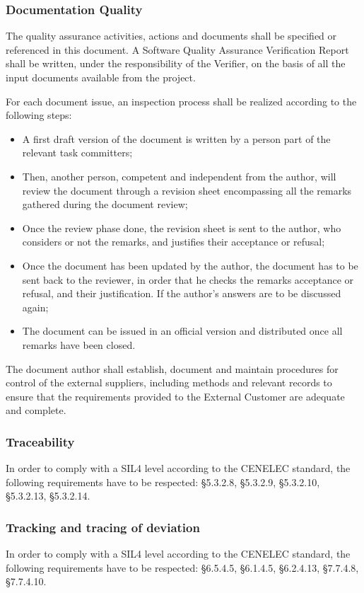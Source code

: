 \documentclass{template/openetcs_article}
\begin{document}
\subsubsection{Documentation Quality}
The quality assurance activities, actions and documents shall be specified or referenced in this document. A Software Quality Assurance Verification Report shall be written, under the responsibility of the Verifier, on the basis of all the input documents available from the project.

For each document issue, an inspection process shall be realized according to the following steps:

\begin{itemize}
\item A first draft version of the document is written by a person part of the relevant task committers;
\item Then, another person, competent and independent from the author, will review the document through a revision sheet encompassing all the remarks gathered during the document review;
\item Once the review phase done, the revision sheet is sent to the author, who considers or not the remarks, and justifies their acceptance or refusal;
\item Once the document has been updated by the author, the document has to be sent back to the reviewer, in order that he checks the remarks acceptance or refusal, and their justification. If the author's answers are to be discussed again;
\item The document can be issued in an official version and distributed once all remarks have been closed.
\end{itemize}


The document author shall establish, document and maintain procedures for control of the external suppliers, including methods and relevant records to ensure that the requirements provided to the External Customer are adequate and complete.


\subsubsection{Traceability}
In order to comply with a SIL4 level according to the CENELEC standard, the following requirements have to be respected: {\S}5.3.2.8, {\S}5.3.2.9, {\S}5.3.2.10, {\S}5.3.2.13, {\S}5.3.2.14.


\subsubsection{Tracking and tracing of deviation}
In order to comply with a SIL4 level according to the CENELEC standard, the following requirements have to be respected: {\S}6.5.4.5, {\S}6.1.4.5, {\S}6.2.4.13, {\S}7.7.4.8, {\S}7.7.4.10.
\end{document}
